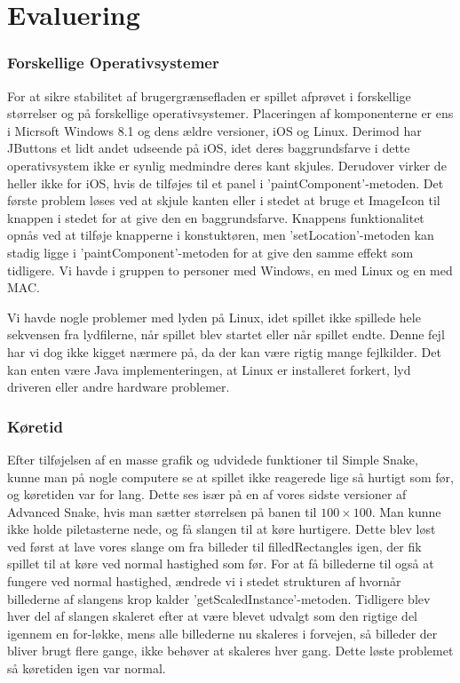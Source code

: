 \section{Evaluering}

\subsubsection{Forskellige Operativsystemer}
For at sikre stabilitet af brugergrænsefladen er spillet afprøvet i forskellige størrelser og på forskellige operativsystemer. Placeringen af komponenterne er ens i Micrsoft Windows 8.1 og dens ældre versioner, iOS og Linux. Derimod har JButtons et lidt andet udseende på iOS, idet deres baggrundsfarve i dette operativsystem ikke er synlig medmindre deres kant skjules. Derudover virker de heller ikke for iOS, hvis de tilføjes til et panel i 'paintComponent'-metoden. Det første problem løses ved at skjule kanten eller i stedet at bruge et ImageIcon til knappen i stedet for at give den en baggrundsfarve. Knappens funktionalitet opnås ved at tilføje knapperne i konstuktøren, men 'setLocation'-metoden kan stadig ligge i 'paintComponent'-metoden for at give den samme effekt som tidligere. Vi havde i gruppen to personer med Windows, en med Linux og en med MAC.
\newline

Vi havde nogle problemer med lyden på Linux, idet spillet ikke spillede hele sekvensen fra lydfilerne, når spillet blev startet eller når spillet endte. Denne fejl har vi dog ikke kigget nærmere på, da der kan være rigtig mange fejlkilder. Det kan enten være Java implementeringen, at Linux er installeret forkert, lyd driveren eller andre hardware problemer.

\subsubsection{Køretid}
Efter tilføjelsen af en masse grafik og udvidede funktioner til Simple Snake, kunne man på nogle computere se at spillet ikke reagerede lige så hurtigt som før, og køretiden var for lang.
Dette ses især på en af vores sidste versioner af Advanced Snake, hvis man sætter størrelsen på banen til $100\times 100$. Man kunne ikke holde piletasterne nede, og få slangen til at køre hurtigere. Dette blev løst ved først at lave vores slange om fra billeder til filledRectangles igen, der fik spillet til at køre ved normal hastighed som før. 
For at få billederne til også at fungere ved normal hastighed, ændrede vi i stedet strukturen af hvornår billederne af slangens krop kalder 'getScaledInstance'-metoden. Tidligere blev hver del af slangen skaleret efter at være blevet udvalgt som den rigtige del igennem en for-løkke, mens alle billederne nu skaleres i forvejen, så billeder der bliver brugt flere gange, ikke behøver at skaleres hver gang. Dette løste problemet så køretiden igen var normal.

